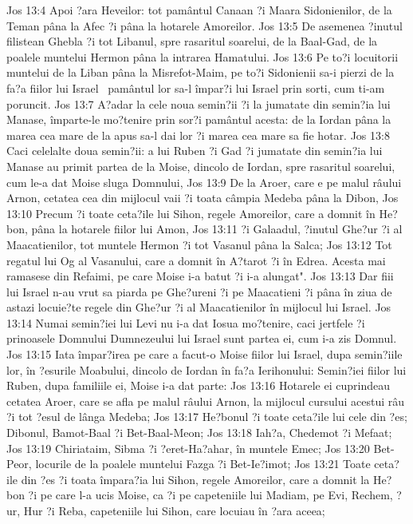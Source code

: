 Jos 13:4  Apoi ?ara Heveilor: tot pamântul Canaan ?i Maara Sidonienilor, de la Teman pâna la Afec ?i pâna la hotarele Amoreilor.
Jos 13:5  De asemenea ?inutul filistean Ghebla ?i tot Libanul, spre rasaritul soarelui, de la Baal-Gad, de la poalele muntelui Hermon pâna la intrarea Hamatului.
Jos 13:6  Pe to?i locuitorii muntelui de la Liban pâna la Misrefot-Maim, pe to?i Sidonienii sa-i pierzi de la fa?a fiilor lui Israel  pamântul lor sa-l împar?i lui Israel prin sorti, cum ti-am poruncit.
Jos 13:7  A?adar la cele noua semin?ii ?i la jumatate din semin?ia lui Manase, împarte-le mo?tenire prin sor?i pamântul acesta: de la Iordan pâna la marea cea mare de la apus sa-l dai lor ?i marea cea mare sa fie hotar.
Jos 13:8  Caci celelalte doua semin?ii: a lui Ruben ?i Gad ?i jumatate din semin?ia lui Manase au primit partea de la Moise, dincolo de Iordan, spre rasaritul soarelui, cum le-a dat Moise sluga Domnului,
Jos 13:9  De la Aroer, care e pe malul râului Arnon, cetatea cea din mijlocul vaii ?i toata câmpia Medeba pâna la Dibon,
Jos 13:10  Precum ?i toate ceta?ile lui Sihon, regele Amoreilor, care a domnit în He?bon, pâna la hotarele fiilor lui Amon,
Jos 13:11  ?i Galaadul, ?inutul Ghe?ur ?i al Maacatienilor, tot muntele Hermon ?i tot Vasanul pâna la Salca;
Jos 13:12  Tot regatul lui Og al Vasanului, care a domnit în A?tarot ?i în Edrea. Acesta mai ramasese din Refaimi, pe care Moise i-a batut ?i i-a alungat".
Jos 13:13  Dar fiii lui Israel n-au vrut sa piarda pe Ghe?ureni ?i pe Maacatieni ?i pâna în ziua de astazi locuie?te regele din Ghe?ur ?i al Maacatienilor în mijlocul lui Israel.
Jos 13:14  Numai semin?iei lui Levi nu i-a dat Iosua mo?tenire, caci jertfele ?i prinoasele Domnului Dumnezeului lui Israel sunt partea ei, cum i-a zis Domnul.
Jos 13:15  Iata împar?irea pe care a facut-o Moise fiilor lui Israel, dupa semin?iile lor, în ?esurile Moabului, dincolo de Iordan în fa?a Ierihonului: Semin?iei fiilor lui Ruben, dupa familiile ei, Moise i-a dat parte:
Jos 13:16  Hotarele ei cuprindeau cetatea Aroer, care se afla pe malul râului Arnon, la mijlocul cursului acestui râu ?i tot ?esul de lânga Medeba;
Jos 13:17  He?bonul ?i toate ceta?ile lui cele din ?es; Dibonul, Bamot-Baal ?i Bet-Baal-Meon;
Jos 13:18  Iah?a, Chedemot ?i Mefaat;
Jos 13:19  Chiriataim, Sibma ?i ?eret-Ha?ahar, în muntele Emec;
Jos 13:20  Bet-Peor, locurile de la poalele muntelui Fazga ?i Bet-Ie?imot;
Jos 13:21  Toate ceta?ile din ?es ?i toata împara?ia lui Sihon, regele Amoreilor, care a domnit la He?bon ?i pe care l-a ucis Moise, ca ?i pe capeteniile lui Madiam, pe Evi, Rechem, ?ur, Hur ?i Reba, capeteniile lui Sihon, care locuiau în ?ara aceea;
